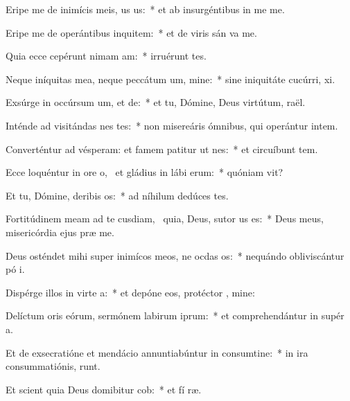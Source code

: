\item Eripe me de inimícis meis, us us:~* et ab insurgéntibus in me  me.
\item Eripe me de operántibus inquitem:~* et de viris sán va me.
\item Quia ecce cepérunt nimam am:~* irruérunt   tes.
\item Neque iníquitas mea, neque peccátum um, mine:~* sine iniquitáte cucúrri,  xi.
\item Exsúrge in occúrsum um, et de:~* et tu, Dómine, Deus virtútum,  raël.
\item Inténde ad visitándas nes tes:~* non misereáris ómnibus, qui operántur intem.
\item Converténtur ad vésperam: et famem patitur ut nes:~* et circuíbunt tem.
\item Ecce loquéntur in ore o,~\pscross{} et gládius in lábi erum:~* quóniam  vit?
\item Et tu, Dómine, deribis os:~* ad níhilum dedúces  tes.
\item Fortitúdinem meam ad te cusdiam,~\pscross{} quia, Deus, sutor us es:~* Deus meus, misericórdia ejus præ me.
\item Deus osténdet mihi super inimícos meos, ne ocdas os:~* nequándo obliviscántur pó i.
\item Dispérge illos in virte a:~* et depóne eos, protéctor , mine:
\item Delíctum oris eórum, sermónem labirum iprum:~* et comprehendántur in supér a.
\item Et de exsecratióne et mendácio annuntiabúntur in consumtine:~* in ira consummatiónis,   runt.
\item Et scient quia Deus domibitur cob:~* et fí ræ.
